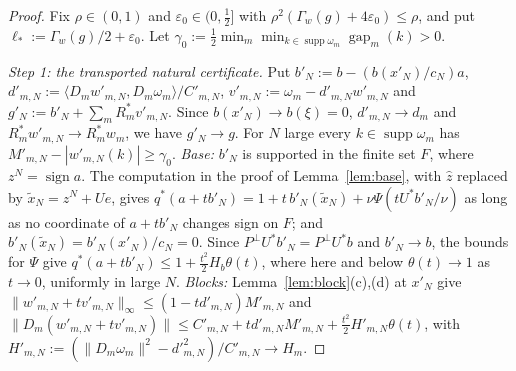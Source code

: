 \documentclass[10pt]{amsart}
\theoremstyle{definition}
\theoremstyle{remark}
\newcommand{\supp}{\operatorname{supp}}
\newcommand{\sgn}{\operatorname{sign}}
\newcommand{\gap}{\operatorname{gap}}
\newcommand{\zh}{\hat z}
\newcommand{\ip}[2]{\langle #1,#2\rangle}
\begin{document}
\begin{proof}
Fix $\rho\in(0,1)$ and $\varepsilon_0\in(0,\frac12]$ with $\rho^2(\Gamma_w(g)+4\varepsilon_0)\le\rho$, and
put $\ell_*:=\Gamma_w(g)/2+\varepsilon_0$.  Let $\gamma_0:=\frac12\min_m\min_{k\in\supp
\omega_m}\gap_m(k)>0$.

\emph{Step 1: the transported natural certificate.}  Put
$b'_N:=b-(b(x'_N)/c_N)a$, $d'_{m,N}:=\ip{D_mw'_{m,N}}{D_m\omega_m}/C'_{m,N}$,
$v'_{m,N}:=\omega_m-d'_{m,N}w'_{m,N}$ and
$g'_N:=b'_N+\sum_mR_m^*v'_{m,N}$.  Since $b(x'_N)\to b(\xi)=0$,
$d'_{m,N}\to d_m$ and $R_m^*w'_{m,N}\to R_m^*w_m$, we have $g'_N\to g$.  For
$N$ large every $k\in\supp\omega_m$ has $M'_{m,N}-|w'_{m,N}(k)|\ge\gamma_0$.
\emph{Base:} $b'_N$ is supported in the finite set $F$, where
$z^N=\sgn a$.  The computation in the proof of Lemma~\ref{lem:base}, with
$\zh$ replaced by $\tilde x_N=z^N+Ue$, gives
$q^*(a+tb'_N)=1+t\,b'_N(\tilde x_N)+\nu\Psi(tU^*b'_N/\nu)$ as long as no
coordinate of $a+tb'_N$ changes sign on $F$; and
$b'_N(\tilde x_N)=b'_N(x'_N)/c_N=0$.  Since $P^\perp U^*b'_N=P^\perp U^*b$
and $b'_N\to b$, the bounds for $\Psi$ give
$q^*(a+tb'_N)\le1+\frac{t^2}2H_b\theta(t)$, where here and below
$\theta(t)\to1$ as $t\to0$, uniformly in large $N$.
\emph{Blocks:} Lemma~\ref{lem:block}(c),(d) at $x'_N$ give
$\|w'_{m,N}+tv'_{m,N}\|_\infty\le(1-td'_{m,N})M'_{m,N}$ and
$\|D_m(w'_{m,N}+tv'_{m,N})\|\le C'_{m,N}+td'_{m,N}M'_{m,N}+\frac{t^2}2
H'_{m,N}\theta(t)$, with $H'_{m,N}:=(\|D_m\omega_m\|^2-d'^2_{m,N})/
C'_{m,N}\to H_m$.


\end{proof}
\end{document}
